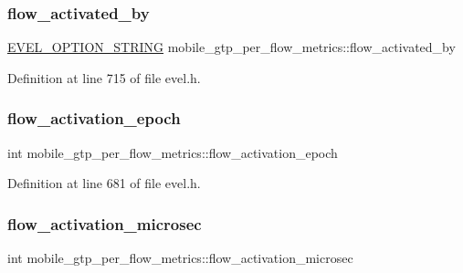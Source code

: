 \subsubsection{\texorpdfstring{flow\+\_\+activated\+\_\+by}{flow\_activated\_by}}
{\footnotesize\ttfamily \hyperlink{evel_8h_a0de5113a7b72de93c0c7b644f7ea7ec3}{E\+V\+E\+L\+\_\+\+O\+P\+T\+I\+O\+N\+\_\+\+S\+T\+R\+I\+NG} mobile\+\_\+gtp\+\_\+per\+\_\+flow\+\_\+metrics\+::flow\+\_\+activated\+\_\+by}



Definition at line 715 of file evel.\+h.

\hypertarget{structmobile__gtp__per__flow__metrics_a4d994baf3d4aead12c78820631c7b23e}{}\label{structmobile__gtp__per__flow__metrics_a4d994baf3d4aead12c78820631c7b23e} 
\subsubsection{\texorpdfstring{flow\+\_\+activation\+\_\+epoch}{flow\_activation\_epoch}}
{\footnotesize\ttfamily int mobile\+\_\+gtp\+\_\+per\+\_\+flow\+\_\+metrics\+::flow\+\_\+activation\+\_\+epoch}



Definition at line 681 of file evel.\+h.

\hypertarget{structmobile__gtp__per__flow__metrics_a37f4239f32c37591cfb931930370bcb1}{}\label{structmobile__gtp__per__flow__metrics_a37f4239f32c37591cfb931930370bcb1} 
\subsubsection{\texorpdfstring{flow\+\_\+activation\+\_\+microsec}{flow\_activation\_microsec}}
{\footnotesize\ttfamily int mobile\+\_\+gtp\+\_\+per\+\_\+flow\+\_\+metrics\+::flow\+\_\+activation\+\_\+microsec}



